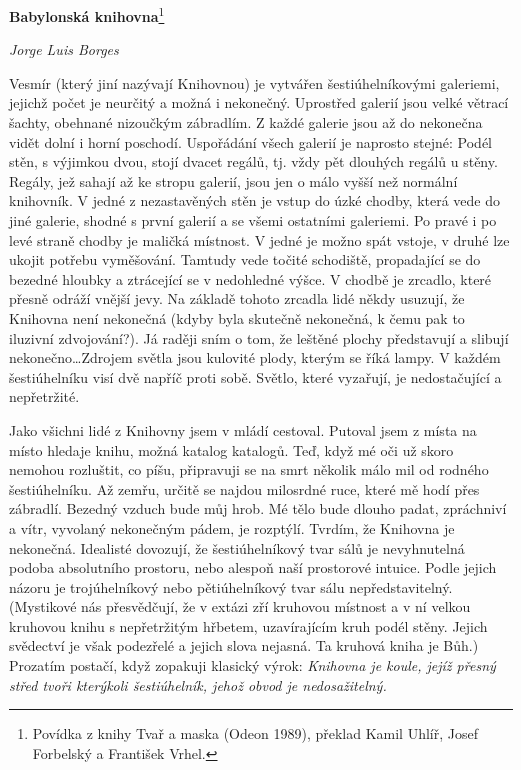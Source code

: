 \documentclass[11pt]{article}
\begin{document}
\noindent
\Huge
\textbf{Babylonská knihovna}\footnote{Povídka z knihy Tvař a maska (Odeon 1989), překlad Kamil Uhlíř, Josef Forbelský a František Vrhel.}

\Large\noindent
\textit{Jorge Luis Borges}
\bigskip

\normalsize
Vesmír (který jiní nazývají Knihovnou) je vytvářen šestiúhelníkovými galeriemi, jejichž počet je neurčitý a možná i nekonečný. Uprostřed galerií jsou velké větrací šachty, obehnané nizoučkým zábradlím. Z každé galerie jsou až do nekonečna vidět dolní i horní poschodí. Uspořádání všech galerií je naprosto stejné: Podél stěn, s výjimkou dvou, stojí dvacet regálů, tj. vždy pět dlouhých regálů u stěny. Regály, jež sahají až ke stropu galerií, jsou jen o málo vyšší než normální knihovník. V jedné z nezastavěných stěn je vstup do úzké chodby, která vede do jiné galerie, shodné s první galerií a se všemi ostatními galeriemi. Po pravé i po levé straně chodby je maličká místnost. V jedné je možno spát vstoje, v druhé lze ukojit potřebu vyměšování. Tamtudy vede točité schodiště, propadající se do bezedné hloubky a ztrácející se v nedohledné výšce. V chodbě je zrcadlo, které přesně odráží vnější jevy. Na základě tohoto zrcadla lidé někdy usuzují, že Knihovna není nekonečná (kdyby byla skutečně nekonečná, k čemu pak to iluzivní zdvojování?). Já raději sním o tom, že leštěné plochy představují a slibují nekonečno\dots Zdrojem světla jsou kulovité plody, kterým se říká lampy. V každém šestiúhelníku visí dvě napříč proti sobě. Světlo, které vyzařují, je nedostačující a nepřetržité.

Jako všichni lidé z Knihovny jsem v mládí cestoval. Putoval jsem z místa na místo hledaje knihu, možná katalog katalogů. Teď, když mé oči už skoro nemohou rozluštit, co píšu, připravuji se na smrt několik málo mil od rodného šestiúhelníku. Až zemřu, určitě se najdou milosrdné ruce, které mě hodí přes zábradlí. Bezedný vzduch bude můj hrob. Mé tělo bude dlouho padat, zpráchniví a vítr, vyvolaný nekonečným pádem, je rozptýlí. Tvrdím, že Knihovna je nekonečná. Idealisté dovozují, že šestiúhelníkový tvar sálů je nevyhnutelná podoba absolutního prostoru, nebo alespoň naší prostorové intuice. Podle jejich názoru je trojúhelníkový nebo pětiúhelníkový tvar sálu nepředstavitelný. (Mystikové nás přesvědčují, že v extázi zří kruhovou místnost a v ní velkou kruhovou knihu s nepřetržitým hřbetem, uzavírajícím kruh podél stěny. Jejich svědectví je však podezřelé a jejich slova nejasná. Ta kruhová kniha je Bůh.) Prozatím postačí, když zopakuji klasický výrok: \textit{Knihovna je koule, jejíž přesný střed tvoři kterýkoli šestiúhelník, jehož obvod je nedosažitelný.}
\end{document}

